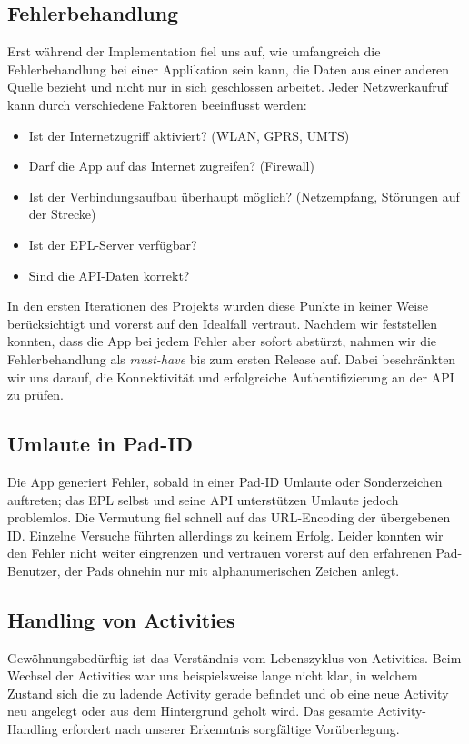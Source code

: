 \subsection{Fehlerbehandlung}
Erst während der Implementation fiel uns auf, wie umfangreich die Fehlerbehandlung bei einer Applikation sein kann, die Daten aus einer anderen Quelle bezieht und nicht nur in sich geschlossen arbeitet.
Jeder Netzwerkaufruf kann durch verschiedene Faktoren beeinflusst werden:
\begin{itemize}
	\item Ist der Internetzugriff aktiviert? (WLAN, GPRS, UMTS)
	\item Darf die App auf das Internet zugreifen? (Firewall)
	\item Ist der Verbindungsaufbau überhaupt möglich? (Netzempfang, Störungen auf der Strecke)
	\item Ist der EPL-Server verfügbar?
	\item Sind die API-Daten korrekt?
\end{itemize}

In den ersten Iterationen des Projekts wurden diese Punkte in keiner Weise berücksichtigt und vorerst auf den Idealfall vertraut.
Nachdem wir feststellen konnten, dass die App bei jedem Fehler aber sofort abstürzt, nahmen wir die Fehlerbehandlung als \textit{must-have} bis zum ersten Release auf.
Dabei beschränkten wir uns darauf, die Konnektivität und erfolgreiche Authentifizierung an der API zu prüfen.

\subsection{Umlaute in Pad-ID}
Die App generiert Fehler, sobald in einer Pad-ID Umlaute oder Sonderzeichen auftreten; das EPL selbst und seine API unterstützen Umlaute jedoch problemlos.
Die Vermutung fiel schnell auf das URL-Encoding der übergebenen ID.
Einzelne Versuche führten allerdings zu keinem Erfolg.
Leider konnten wir den Fehler nicht weiter eingrenzen und vertrauen vorerst auf den erfahrenen Pad-Benutzer, der Pads ohnehin nur mit alphanumerischen Zeichen anlegt.

\subsection{Handling von Activities}
\label{sub:prob:activities}
Gewöhnungsbedürftig ist das Verständnis vom Lebenszyklus von Activities.
Beim Wechsel der Activities war uns beispielsweise lange nicht klar, in welchem Zustand sich die zu ladende Activity gerade befindet und ob eine neue Activity neu angelegt oder aus dem Hintergrund geholt wird.
Das gesamte Activity-Handling erfordert nach unserer Erkenntnis sorgfältige Vorüberlegung.

